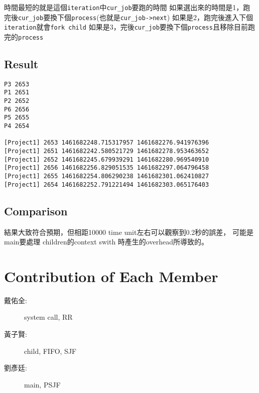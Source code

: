 \documentclass[12pt, a4paper]{article}
\begin{document}
時間最短的就是這個\texttt{iteration}中\texttt{cur\_job}要跑的時間
如果選出來的時間是1，跑完後\texttt{cur\_job}要換下個\texttt{process}(也就是\texttt{cur\_job->next})
如果是2，跑完後進入下個\texttt{iteration}就會\texttt{fork child}
如果是3，完後\texttt{cur\_job}要換下個\texttt{process}且移除目前跑完的\texttt{process}

\subsection{Result}
\begin{verbatim}
P3 2653
P1 2651
P2 2652
P6 2656
P5 2655
P4 2654

[Project1] 2653 1461682248.715317957 1461682276.941976396
[Project1] 2651 1461682242.580521729 1461682278.953463652
[Project1] 2652 1461682245.679939291 1461682280.969540910
[Project1] 2656 1461682256.829051535 1461682297.064796458
[Project1] 2655 1461682254.806290238 1461682301.062410827
[Project1] 2654 1461682252.791221494 1461682303.065176403
\end{verbatim}
\subsection{Comparison}
結果大致符合預期，但相距10000 time unit左右可以觀察到0.2秒的誤差， 可能是main要處理
children的context swith 時產生的overhead所導致的。
\section{Contribution of Each Member}
\begin{description}
\item[戴佑全:] system call, RR
\item[黃子賢:] child, FIFO, SJF
\item[劉彥廷:] main, PSJF
\end{description}
\end{document}
